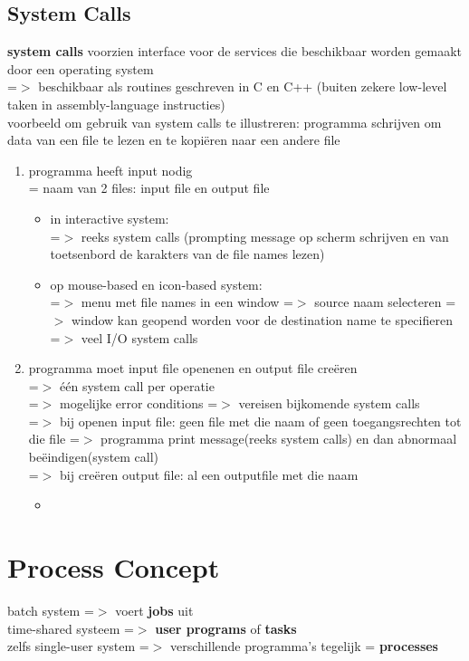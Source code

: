 \documentclass{report}
\begin{document}
\section{System Calls}
\textbf{system calls} voorzien interface voor de services die beschikbaar worden gemaakt door een operating system 
\\=$>$ beschikbaar als routines geschreven in C en C++ (buiten zekere low-level taken in assembly-language instructies)
\\ voorbeeld om gebruik van system calls te illustreren: programma schrijven om data van een file te lezen en te kopi\"eren naar een andere file
\begin{enumerate}
\item programma heeft input nodig
\\= naam van 2 files: input file en output file
\begin{itemize}
\item in interactive system:
\\=$>$ reeks system calls (prompting message op scherm schrijven en van toetsenbord de karakters van de file names lezen)
\item op mouse-based en icon-based system:
\\=$>$ menu met file names in een window =$>$ source naam selecteren =$>$ window kan geopend worden voor de destination name te specifieren
\\=$>$ veel I/O system calls
\end{itemize}
\item programma moet input file openenen en output file cre\"eren
\\=$>$ \'e\'en system call per operatie
\\=$>$ mogelijke error conditions =$>$ vereisen bijkomende system calls
\\=$>$ bij openen input file: geen file met die naam of geen toegangsrechten tot die file =$>$ programma print message(reeks system calls) en dan abnormaal be\"eindigen(system call)
\\=$>$ bij cre\"eren output file: al een outputfile met die naam
\begin {itemize}
\item 
\end {itemize}

\end{enumerate}


\chapter{Process Concept}
batch system =$>$ voert \textbf{jobs} uit
\\time-shared systeem =$>$ \textbf{user programs} of \textbf{tasks}
\\zelfs single-user system =$>$ verschillende programma's tegelijk = \textbf{processes}
\end{document}
